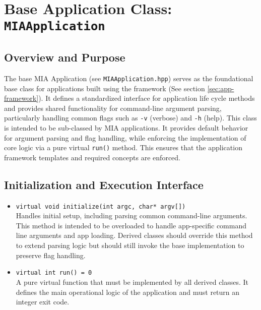 \section{Base Application Class: \texttt{MIAApplication}}
\label{sec:base-application}

\subsection*{Overview and Purpose}
The base MIA Application (see \texttt{MIAApplication.hpp}) serves as the foundational base class for applications built using the framework (See section \ref{sec:app-framework}). It defines a standardized interface for application life cycle methods and provides shared functionality for command-line argument parsing, particularly handling common flags such as \texttt{-v} (verbose) and \texttt{-h} (help). This class is intended to be sub-classed by MIA applications. It provides default behavior for argument parsing and flag handling, while enforcing the implementation of core logic via a pure virtual \texttt{run()} method. This ensures that the application framework templates and required concepts are enforced.

\subsection*{Initialization and Execution Interface}
\begin{itemize}
	\item \texttt{virtual void initialize(int argc, char* argv[])} \\
	Handles initial setup, including parsing common command-line arguments. This method is intended to be overloaded to handle app-specific command line arguments and app loading. Derived classes should override this method to extend parsing logic but should still invoke the base implementation to preserve flag handling.
\end{itemize}

\begin{itemize}
	\item \texttt{virtual int run() = 0} \\
	A pure virtual function that must be implemented by all derived classes. It defines the main operational logic of the application and must return an integer exit code.
\end{itemize}

